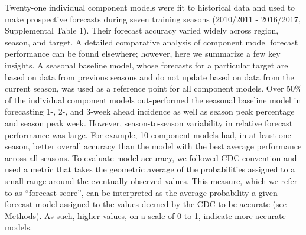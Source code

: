 \documentclass{article}\usepackage[]{graphicx}\usepackage[]{color}
\begin{document}
%


Twenty-one individual component models were fit to historical data and used to make prospective forecasts during seven training seasons (2010/2011 - 2016/2017, Supplemental Table 1). 
Their forecast accuracy varied widely across region, season, and target.
A detailed comparative analysis of component model forecast performance can be found elsewhere\cite{reich2019collaborative}; however, here we summarize a few key insights.
A seasonal baseline model, whose forecasts for a particular target are based on data from previous seasons and do not update based on data from the current season, was used as a reference point for all component models.
Over 50\% of the individual component models out-performed the seasonal baseline model in forecasting 1-, 2-, and 3-week ahead incidence as well as season peak percentage and season peak week.
However, season-to-season variability in relative forecast performance was large.
For example, 10 component models had, in at least one season, better overall accuracy than the model with the best average performance across all seasons. 
To evaluate model accuracy, we followed CDC convention and used a metric that takes the geometric average of the probabilities assigned to a small range around the eventually observed values. 
This measure, which we refer to as ``forecast score'', can be interpreted as the average probability a given forecast model assigned to the values deemed by the CDC to be accurate (see Methods).
As such, higher values, on a scale of 0 to 1, indicate more accurate models.


\end{document}
